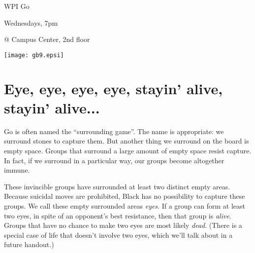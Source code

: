 \documentclass{article}
\begin{document}
\centerline{\Huge WPI Go}
\centerline{\Huge Wednesdays, 7pm}
\centerline{\Huge @ Campus Center, 2nd floor}
\vfill

\begin{center}
\texttt{[image: gb9.epsi]}
\end{center}

\vfill

\newpage

\section*{Eye, eye, eye, eye, stayin' alive, stayin' alive...}

Go is often named the ``surrounding game''.  The name is appropriate: we
surround stones to capture them.  But another thing we surround on the
board is empty space.  Groups that surround a large amount of empty
space resist capture.  In fact, if we surround in a particular way,
our groups become altogether immune.
\begin{center}
\hspace{.2in}
\hspace{.2in}
%
%
\hspace{.2in}
\end{center}
These invincible groups have surrounded at least two distinct empty
areas.  Because suicidal moves are prohibited, Black has no
possibility to capture these groups.  We call these empty surrounded
areas \emph{eyes}.  If a group can form at least two eyes, in spite of
an opponent's best resistance, then that group is \emph{alive}.
Groups that have no chance to make two eyes are most likely
\emph{dead}.  (There is a special case of life that doesn't involve
two eyes, which we'll talk about in a future handout.)
\end{document}
